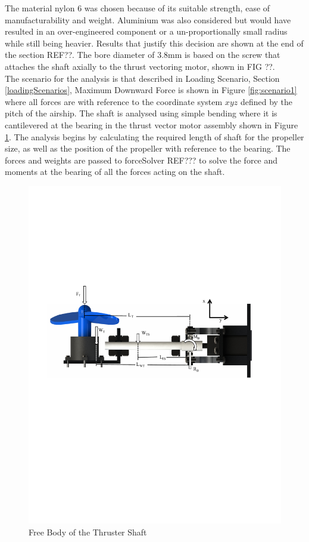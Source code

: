 \documentclass[../main.tex]{subfiles}
\begin{document}
The material nylon 6 was chosen because of its suitable strength, ease of manufacturability and weight. Aluminium was also considered but would have resulted in an over-engineered component or a un-proportionally small radius while still being heavier. Results that justify this decision are shown at the end of the section REF??. The bore diameter of 3.8mm is based on the screw that attaches the shaft axially to the thrust vectoring motor, shown in FIG ??.\\

The scenario for the analysis is that described in Loading Scenario, Section \ref{loadingScenarios}, Maximum Downward Force is shown in Figure \ref{fig:scenario1} where all forces are with reference to the coordinate system $xyz$ defined by the pitch of the airship. The shaft is analysed using simple bending where it is cantilevered at the bearing in the thrust vector motor assembly shown in Figure \ref{fig:thrusterShaftFBD}. The analysis begins by calculating the required length of shaft for the propeller size, as well as the position of the propeller with reference to the bearing. The forces and weights are passed to forceSolver REF??? to solve the force and moments at the bearing of all the forces acting on the shaft.

\begin{figure}[H]
	\centering
	\includegraphics[width=.9\linewidth]{img/analysis/thruster/thrusterShaft.pdf}
	\caption{Free Body of the Thruster Shaft}
	\label{fig:thrusterShaftFBD}
\end{figure}
\end{document}
